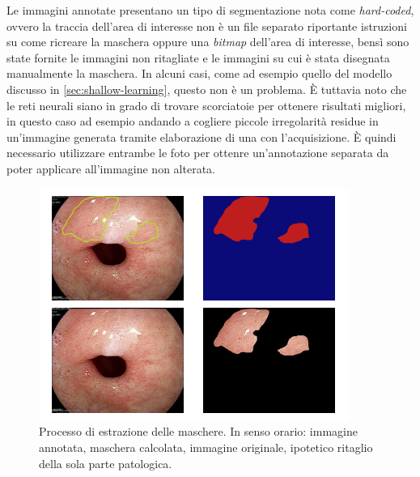 Le immagini annotate presentano un tipo di segmentazione nota
come {\it hard-coded}, ovvero la traccia dell'area di interesse
non è un file separato riportante istruzioni su come ricreare
la maschera oppure una {\it bitmap} dell'area di interesse,
bensì sono state fornite le immagini non ritagliate e
le immagini su cui è stata disegnata manualmente la maschera.
In alcuni casi, come ad esempio quello del modello discusso
in \ref{sec:shallow-learning}, questo non è un problema.
È tuttavia noto che le reti neurali siano in grado di trovare
scorciatoie per ottenere risultati migliori, in questo caso
ad esempio andando a cogliere piccole irregolarità residue
in un'immagine generata tramite elaborazione di una con
l'acquisizione.
È quindi necessario utilizzare entrambe le foto per ottenre
un'annotazione separata da poter applicare all'immagine non
alterata.

\begin{figure}[h]
    \center
    \includegraphics[width=0.9\textwidth]{./assets/cutout2.png}
    \caption{\label{fig:cutout}Processo di estrazione delle maschere.
    In senso orario: immagine annotata, maschera calcolata, immagine originale,
    ipotetico ritaglio della sola parte patologica.}
\end{figure}

